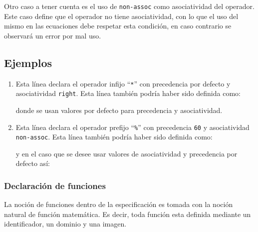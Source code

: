 Otro caso a tener cuenta es el uso de \texttt{non-assoc} como asociatividad del operador. Este caso define que el operador no tiene asociatividad, con lo que el uso del mismo en las ecuaciones debe respetar esta condición, en caso contrario se observará un error por mal uso.
\subsection*{Ejemplos}

\begin{enumerate}

\item 
\begin{center}
\end{center}
\vspace{0.2cm}
Esta línea declara el operador infijo ``\texttt{*}'' con precedencia por defecto y asociatividad \texttt{right}. Esta línea también podría haber sido definida como:
\vspace{0.2cm}
\begin{center}
\end{center}
\vspace{0.2cm}
donde se usan valores por defecto para precedencia y asociatividad.

\item 
\begin{center}
\end{center}
\vspace{0.2cm}
Esta línea declara el operador prefijo ``\texttt{\%}'' con precedencia \texttt{60} y asociatividad \texttt{non-assoc}. Esta línea también podría haber sido definida como:
\vspace{0.2cm}

\begin{center}
\end{center}
\vspace{0.2cm}
y en el caso que se desee usar valores de asociatividad y precedencia por defecto así:
\vspace{0.2cm}

\begin{center}
\end{center}
\end{enumerate}
\subsubsection{Declaración de funciones}
La noción de funciones dentro de la especificación es tomada con la noción natural de función matemática. Es decir, toda función esta definida mediante un identificador, un dominio y una imagen.

